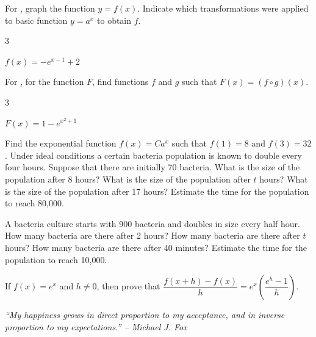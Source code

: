\documentclass{book}
\begin{document}
For , graph the function $y=f(x)$. Indicate which transformations were applied to basic function $y=a^x$ to obtain $f$.
\begin{enumerate}[!HW!]
\begin{multicols}{3}
\item\label{exer:graphtransformexp:start} \label{exer:graphtransformexp:stop} $f(x) = -e^{x-1}+2$ 
\end{multicols}
\end{enumerate}

For , for the function $F$, find functions $f$ and $g$ such that $F(x)  = (f\circ g)(x)$. 
\begin{enumerate}[!HW!]
\begin{multicols}{3}
\item \label{exer:decomposeexp:start}\label{exer:decomposeexp:stop} $F(x) = 1-e^{x^2+1}$
\end{multicols}
\end{enumerate}

\begin{enumerate}[!HW!]
\itemspade Find the exponential function $f(x)  = Ca^x$ such that $f(1)=8$ and $f(3)=32$. 
\itemspade Under ideal conditions a certain bacteria population is known to double every four hours. Suppose that there are initially 70 bacteria. What is the size of the population after 8 hours? What is the size of the population after $t$ hours? What is the size of the population after 17 hours? Estimate the time for the population to reach 80,000.

\itemspade A bacteria culture starts with 900 bacteria and doubles in size every half hour. How many bacteria are there after 2 hours? How many bacteria are there after $t$ hours? How many bacteria are there after 40 minutes? Estimate the time for the population to reach 10,000.

\itemspade If $f(x)=e^x$ and $h\neq 0$, then prove that $\dfrac{f(x+h)-f(x)}{h} = e^x\left(\dfrac{e^h-1}{h}\right)$.

\end{enumerate}

\pagebreak
\begin{center} 
\emph{``My happiness grows in direct proportion to my acceptance, and in inverse proportion to my expectations.'' -- Michael J. Fox}
\end{center}
\end{document}
